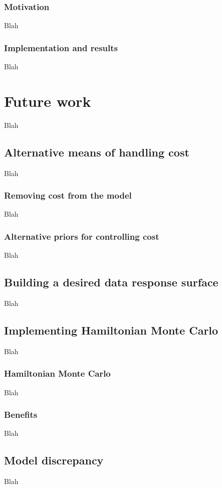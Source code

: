 \documentclass{article}
\begin{document}
\subsubsection{Motivation}
Blah

\subsubsection{Implementation and results}
Blah


\section{Future work}
Blah

\subsection{Alternative means of handling cost}
Blah

\subsubsection{Removing cost from the model}
Blah

\subsubsection{Alternative priors for controlling cost}
Blah

\subsection{Building a desired data response surface}
Blah

\subsection{Implementing Hamiltonian Monte Carlo}
Blah

\subsubsection{Hamiltonian Monte Carlo}
Blah

\subsubsection{Benefits}
Blah

\subsection{Model discrepancy}
Blah
\end{document}
